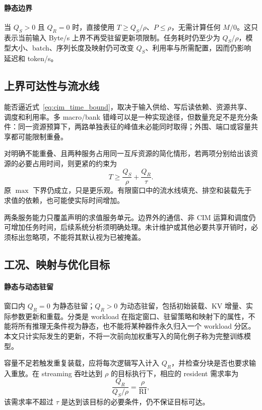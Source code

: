 \documentclass[11pt, a4paper]{ctexart}
\theoremstyle{definition}
\newcommand{\RI}{\mathrm{RI}}
\begin{document}
\paragraph{静态边界}
当 $Q_S>0$ 且 $Q_R=0$ 时，直接使用 $T\ge Q_S/\rho$、$P\le\rho$，无需计算任何 $M/0$。这只表示当前输入 Byte/s 上界不再受驻留更新项限制。任务耗时仍至少为 $Q_S/\rho$，模型大小、batch、序列长度及映射仍可改变 $Q_S$、利用率与所需配置，因而仍影响延迟和 token/s。

\subsection{上界可达性与流水线}
\label{sec:pipeline}

能否逼近式~\eqref{eq:cim_time_bound}，取决于输入供给、写后读依赖、资源共享、调度和利用率。多 macro/bank 错峰可以是一种实现途径，但数量充足不是充分条件：同一资源预算下，两路单独表征的峰值未必能同时取得；外围、端口或容量共享都可能限制重叠。

对明确不能重叠、且两种服务占用同一互斥资源的简化情形，若两项分别给出该资源的必要占用时间，则更紧的约束为
\[
T\ge\frac{Q_S}{\rho}+\frac{Q_R}{\tau}.
\]
原 $\max$ 下界仍成立，只是更乐观。有限窗口中的流水线填充、排空和装载先于求值的依赖，也可能使实际时间增加。

两条服务能力只覆盖声明的求值服务单元。边界外的通信、非 CIM 运算和调度仍可增加任务时间，后续系统分析须明确处理。未计维护或其他必要共享开销时，必须标出忽略项，不能将其默认视为已被掩盖。

\subsection{工况、映射与优化目标}
\label{sec:modes}

\paragraph{静态与动态驻留}
窗口内 $Q_R=0$ 为静态驻留；$Q_R>0$ 为动态驻留，包括初始装载、KV 增量、实际参数更新和重载。分类是 workload 在指定窗口、驻留策略和映射下的属性，不能将所有推理无条件视为静态，也不能将某种器件永久归入一个 workload 分区。本文只计实际发生的更新，不将一次前向加权重写入的简化例子称为完整训练模型。

容量不足若触发重复装载，应将每次逻辑写入计入 $Q_R$，并检查分块是否也要求输入重放。在 streaming 吞吐达到 $\rho$ 的目标执行下，相应的 resident 需求率为
\[
\frac{Q_R}{Q_S/\rho}=\frac{\rho}{\RI},
\]
该需求率不超过 $\tau$ 是达到该目标的必要条件，仍不保证目标可达。
\end{document}
